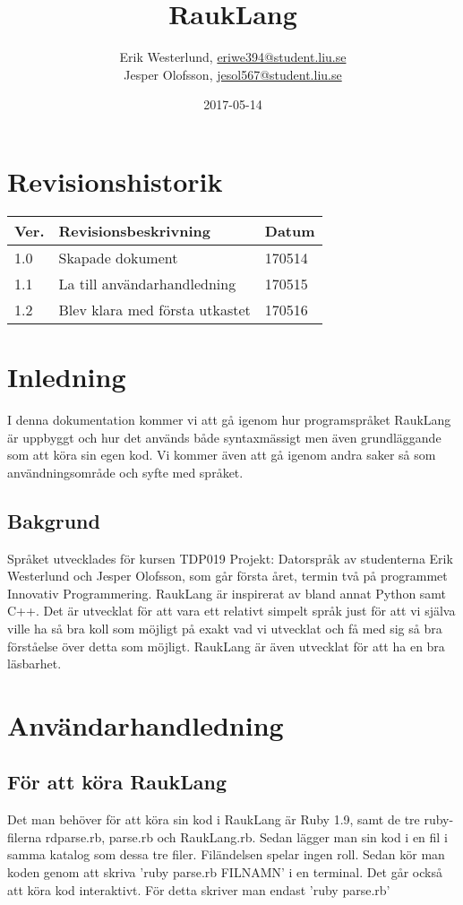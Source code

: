 \documentclass[12pt]{TDP019}
\author{Erik Westerlund, \url{eriwe394@student.liu.se}\\
  Jesper Olofsson, \url{jesol567@student.liu.se}\\}
\title{RaukLang}
\date{2017-05-14}
\begin{document}
\projectpage
\tableofcontents
\newpage
\section{Revisionshistorik}
\begin{table}[!h]
\begin{tabularx}{\linewidth}{|l|X|l|}
\hline
Ver. & Revisionsbeskrivning & Datum \\\hline
1.0 & Skapade dokument & 170514 \\\hline
1.1 & La till användarhandledning & 170515 \\\hline
1.2 & Blev klara med första utkastet & 170516 \\\hline
\end{tabularx}
\end{table}


\section{Inledning}
I denna dokumentation kommer vi att gå igenom hur programspråket RaukLang är uppbyggt och hur det används både syntaxmässigt men även grundläggande som att köra sin egen kod. Vi kommer även att gå igenom andra saker så som användningsområde och syfte med språket.

\subsection{Bakgrund}
Språket utvecklades för kursen TDP019 Projekt: Datorspråk av studenterna Erik Westerlund och Jesper Olofsson, som går första året, termin två på programmet Innovativ Programmering. RaukLang är inspirerat av bland annat Python samt C++. Det är utvecklat för att vara ett relativt simpelt språk just för att vi själva ville ha så bra koll som möjligt på exakt vad vi utvecklat och få med sig så bra förståelse över detta som möjligt. RaukLang är även utvecklat för att ha en bra läsbarhet.

\newpage
\section{Användarhandledning}
\subsection{För att köra RaukLang}
Det man behöver för att köra sin kod i RaukLang är Ruby 1.9, samt de tre ruby-filerna rdparse.rb, parse.rb och RaukLang.rb. Sedan lägger man sin kod i en fil i samma katalog som dessa tre filer. Filändelsen spelar ingen roll. Sedan kör man koden genom att skriva 'ruby parse.rb FILNAMN' i en terminal. Det går också att köra kod interaktivt. För detta skriver man endast 'ruby parse.rb'
\end{document}
